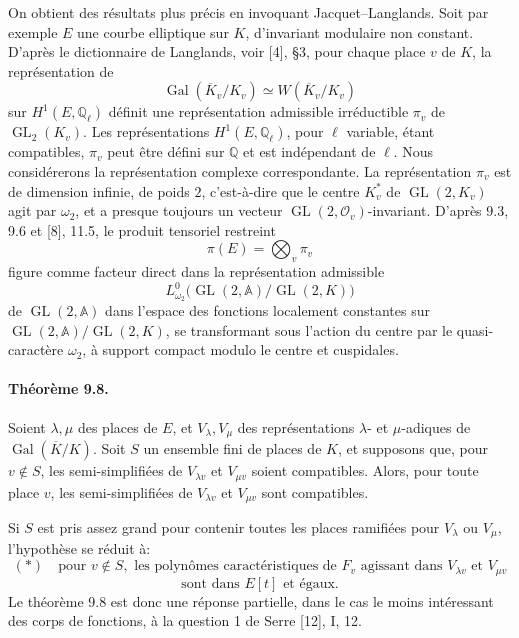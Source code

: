 \documentclass[10pt]{article}
\newcommand{\Q}{\mathbb Q}
\newcommand{\Gal}{\operatorname{Gal}}
\newcommand{\GL}{\operatorname{GL}}
\providecommand{\Gal}{\operatorname{Gal}}
\providecommand{\GL}{\operatorname{GL}}
\providecommand{\Gal}{\operatorname{Gal}}
\providecommand{\GL}{\operatorname{GL}}
\providecommand{\Gal}{\operatorname{Gal}}
\providecommand{\Gal}{\operatorname{Gal}}
\begin{document}
On obtient des résultats plus précis en invoquant Jacquet--Langlands. Soit par exemple $E$ une courbe elliptique sur $K$, d'invariant modulaire non constant. D'après le dictionnaire de Langlands, voir [4], §3, pour chaque place $v$ de $K$, la représentation de
\[
\Gal(\overline K_v/K_v)\simeq W(\overline K_v/K_v)
\]
sur $H^1(E,\Q_\ell)$ définit une représentation admissible irréductible $\pi_v$ de $\GL_2(K_v)$. Les représentations $H^1(E,\Q_\ell)$, pour $\ell$ variable, étant compatibles, $\pi_v$ peut être défini sur $\Q$ et est indépendant de $\ell$. Nous considérerons la représentation complexe correspondante. La représentation $\pi_v$ est de dimension infinie, de poids $2$, c'est-à-dire que le centre $K_v^*$ de $\GL(2,K_v)$ agit par $\omega_2$, et a presque toujours un vecteur $\GL(2,\mathcal O_v)$-invariant. D'après 9.3, 9.6 et [8], 11.5, le produit tensoriel restreint
\[
\pi(E)=\bigotimes_v \pi_v
\]
figure comme facteur direct dans la représentation admissible
\[
L^0_{\omega_2}\bigl(\GL(2,\mathbb A)/\GL(2,K)\bigr)
\]
de $\GL(2,\mathbb A)$ dans l'espace des fonctions localement constantes sur $\GL(2,\mathbb A)/\GL(2,K)$, se transformant sous l'action du centre par le quasi-caractère $\omega_2$, à support compact modulo le centre et cuspidales.

\paragraph{Théorème 9.8.} Soient $\lambda,\mu$ des places de $E$, et $V_\lambda,V_\mu$ des représentations $\lambda$- et $\mu$-adiques de $\Gal(\overline K/K)$. Soit $S$ un ensemble fini de places de $K$, et supposons que, pour $v\notin S$, les semi-simplifiées de $V_{\lambda v}$ et $V_{\mu v}$ soient compatibles. Alors, pour toute place $v$, les semi-simplifiées de $V_{\lambda v}$ et $V_{\mu v}$ sont compatibles.

Si $S$ est pris assez grand pour contenir toutes les places ramifiées pour $V_\lambda$ ou $V_\mu$, l'hypothèse se réduit à:
\[
(*)\quad
\text{pour }v\notin S,\text{ les polynômes caractéristiques de }F_v
\text{ agissant dans }V_{\lambda v}\text{ et }V_{\mu v}
\]
\[
\text{sont dans }E[t]\text{ et égaux.}
\]
Le théorème 9.8 est donc une réponse partielle, dans le cas le moins intéressant des corps de fonctions, à la question 1 de Serre [12], I, 12.
\end{document}
